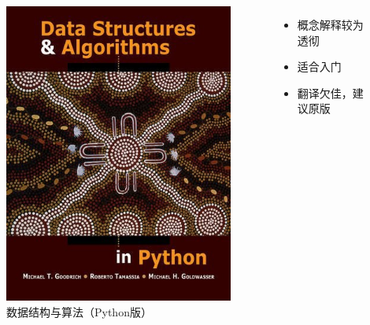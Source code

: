 \begin{frame}{\insertsubsectionhead}
    \begin{columns}
        \vspace{4ex}
        \begin{figure}
            \centering
            \includegraphics[height=0.6\textheight]{images/goodrich2013data.jpg}
            \caption{数据结构与算法（Python版）\cite{goodrich2013data}}
            \label{fig:goodrich2013data}
        \end{figure}
        \begin{itemize}
            \item 概念解释较为透彻
            \item 适合入门
            \item 翻译欠佳，建议原版
        \end{itemize}
    \end{columns}
\end{frame}

